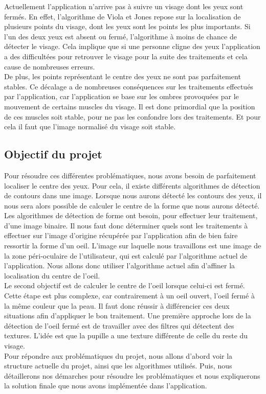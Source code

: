 Actuellement l'application n'arrive pas à suivre un visage dont les yeux sont fermés. En effet,
l'algorithme de Viola et Jones repose sur la localisation de plusieurs points du visage, dont 
les yeux sont les points les plus importants. Si l'un des deux yeux est absent ou fermé, l'algorithme 
à moins de chance de détecter le visage. Cela implique que si une personne cligne des yeux
l'application a des difficultées pour retrouver le visage pour la suite des traitements et cela 
cause de nombreuses erreurs.\\

De plus, les points représentant le centre des yeux ne sont pas parfaitement stables. Ce décalage a de 
nombreuses conséquences sur les traitements effectués par l'application, car l'application se base sur 
les ombres provoquées par le mouvement de certains muscles du 
visage. Il est donc primordial que la position de ces muscles soit stable, pour ne pas les confondre
lors des traitements. Et pour cela il faut que l'image normalisé du visage soit stable.\\


\subsection{Objectif du projet}
Pour résoudre ces différentes problématiques, nous avons besoin de parfaitement localiser le centre des
yeux. Pour cela, il existe différents algorithmes de détection de contours dans une image. Lorsque nous aurons
détecté les contours des yeux, il nous sera alors possible de calculer le centre de la forme
que nous aurons détecté. Les algorithmes de détection de forme ont besoin, pour effectuer leur traitement,
d'une image binaire. Il nous faut donc déterminer quels sont les traitements à effectuer
sur l'image d'origine récupérée par l'application afin de bien faire ressortir la forme d'un oeil. L'image
sur laquelle nous travaillons est une image de la zone péri-oculaire de l'utilisateur, qui est calculé par
l'algorithme actuel de l'application. Nous allons donc utiliser l'algorithme actuel afin d'affiner la localisation
du centre de l'oeil.\\

Le second objectif est de calculer le centre de l'oeil lorsque celui-ci est fermé. Cette étape est plus complexe,
car contrairement à un oeil ouvert, l'oeil fermé à la même couleur que la peau. Il faut donc réussir à différencier ces
deux situations afin d'appliquer le bon traitement. Une première approche lors de la détection de l'oeil fermé est 
de travailler avec des filtres qui détectent des textures. L'idée est que la pupille a une texture différente de celle 
du reste du visage.\\

Pour répondre aux problématiques du projet, nous allons d'abord voir la structure actuelle du projet, ainsi que les algorithmes
utilisés. Puis, nous détaillerons nos démarches pour résoudre les problématiques et nous expliquerons la solution finale que nous avons
implémentée dans l'application.

\newpage
